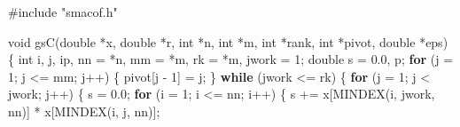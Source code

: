 \documentclass[
  12pt,
  letterpaper,
  DIV=11,
  numbers=noendperiod]{scrreprt}
\newenvironment{Shaded}{\begin{snugshade}}{\end{snugshade}}
\newcommand{\ControlFlowTok}[1]{\textcolor[rgb]{0.00,0.23,0.31}{\textbf{#1}}}
\newcommand{\DataTypeTok}[1]{\textcolor[rgb]{0.68,0.00,0.00}{#1}}
\newcommand{\DecValTok}[1]{\textcolor[rgb]{0.68,0.00,0.00}{#1}}
\newcommand{\FloatTok}[1]{\textcolor[rgb]{0.68,0.00,0.00}{#1}}
\newcommand{\ImportTok}[1]{\textcolor[rgb]{0.00,0.46,0.62}{#1}}
\newcommand{\NormalTok}[1]{\textcolor[rgb]{0.00,0.23,0.31}{#1}}
\newcommand{\OperatorTok}[1]{\textcolor[rgb]{0.37,0.37,0.37}{#1}}
\newcommand{\PreprocessorTok}[1]{\textcolor[rgb]{0.68,0.00,0.00}{#1}}
\theoremstyle{remark}
\begin{document}
\begin{Shaded}
\begin{Highlighting}[]
\PreprocessorTok{\#include }\ImportTok{"smacof.h"}

\DataTypeTok{void}\NormalTok{ gsC}\OperatorTok{(}\DataTypeTok{double} \OperatorTok{*}\NormalTok{x}\OperatorTok{,} \DataTypeTok{double} \OperatorTok{*}\NormalTok{r}\OperatorTok{,} \DataTypeTok{int} \OperatorTok{*}\NormalTok{n}\OperatorTok{,} \DataTypeTok{int} \OperatorTok{*}\NormalTok{m}\OperatorTok{,} \DataTypeTok{int} \OperatorTok{*}\NormalTok{rank}\OperatorTok{,} \DataTypeTok{int} \OperatorTok{*}\NormalTok{pivot}\OperatorTok{,}
         \DataTypeTok{double} \OperatorTok{*}\NormalTok{eps}\OperatorTok{)} \OperatorTok{\{}
    \DataTypeTok{int}\NormalTok{ i}\OperatorTok{,}\NormalTok{ j}\OperatorTok{,}\NormalTok{ ip}\OperatorTok{,}\NormalTok{ nn }\OperatorTok{=} \OperatorTok{*}\NormalTok{n}\OperatorTok{,}\NormalTok{ mm }\OperatorTok{=} \OperatorTok{*}\NormalTok{m}\OperatorTok{,}\NormalTok{ rk }\OperatorTok{=} \OperatorTok{*}\NormalTok{m}\OperatorTok{,}\NormalTok{ jwork }\OperatorTok{=} \DecValTok{1}\OperatorTok{;}
    \DataTypeTok{double}\NormalTok{ s }\OperatorTok{=} \FloatTok{0.0}\OperatorTok{,}\NormalTok{ p}\OperatorTok{;}
    \ControlFlowTok{for} \OperatorTok{(}\NormalTok{j }\OperatorTok{=} \DecValTok{1}\OperatorTok{;}\NormalTok{ j }\OperatorTok{\textless{}=}\NormalTok{ mm}\OperatorTok{;}\NormalTok{ j}\OperatorTok{++)} \OperatorTok{\{}
\NormalTok{        pivot}\OperatorTok{[}\NormalTok{j }\OperatorTok{{-}} \DecValTok{1}\OperatorTok{]} \OperatorTok{=}\NormalTok{ j}\OperatorTok{;}
    \OperatorTok{\}}
    \ControlFlowTok{while} \OperatorTok{(}\NormalTok{jwork }\OperatorTok{\textless{}=}\NormalTok{ rk}\OperatorTok{)} \OperatorTok{\{}
        \ControlFlowTok{for} \OperatorTok{(}\NormalTok{j }\OperatorTok{=} \DecValTok{1}\OperatorTok{;}\NormalTok{ j }\OperatorTok{\textless{}}\NormalTok{ jwork}\OperatorTok{;}\NormalTok{ j}\OperatorTok{++)} \OperatorTok{\{}
\NormalTok{            s }\OperatorTok{=} \FloatTok{0.0}\OperatorTok{;}
            \ControlFlowTok{for} \OperatorTok{(}\NormalTok{i }\OperatorTok{=} \DecValTok{1}\OperatorTok{;}\NormalTok{ i }\OperatorTok{\textless{}=}\NormalTok{ nn}\OperatorTok{;}\NormalTok{ i}\OperatorTok{++)} \OperatorTok{\{}
\NormalTok{                s }\OperatorTok{+=}\NormalTok{ x}\OperatorTok{[}\NormalTok{MINDEX}\OperatorTok{(}\NormalTok{i}\OperatorTok{,}\NormalTok{ jwork}\OperatorTok{,}\NormalTok{ nn}\OperatorTok{)]} \OperatorTok{*}\NormalTok{ x}\OperatorTok{[}\NormalTok{MINDEX}\OperatorTok{(}\NormalTok{i}\OperatorTok{,}\NormalTok{ j}\OperatorTok{,}\NormalTok{ nn}\OperatorTok{)];}

\end{Highlighting}
\end{Shaded}
\end{document}
